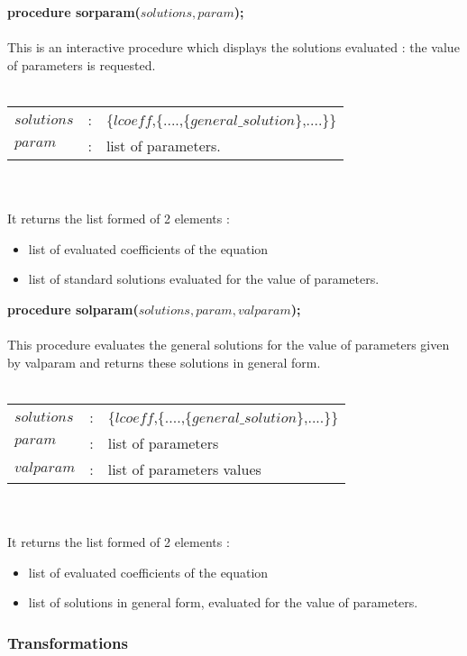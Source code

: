 {\bf procedure sorparam($solutions,param$);} \\
\ \\
This is an interactive procedure which displays the solutions evaluated :
the value of parameters is requested. \\
\ \\
\begin{tabular}{lcl}
$solutions$ & : & \{$lcoeff$,\{....,\{$general\_solution$\},....\}\} \\
$param$ & : & list of parameters. \\
\end{tabular} \\
\ \\
It returns the list formed of 2 elements :
\begin{itemize}
\item list of evaluated coefficients of the equation
\item list of standard solutions evaluated for the value of parameters.
\end{itemize}

{\bf procedure solparam($solutions,param,valparam$);} \\
\ \\
This procedure evaluates the general solutions for the value of parameters
given by valparam and returns these solutions in general form. \\
\ \\
\begin{tabular}{lcl}
$solutions$ & : & \{$lcoeff$,\{....,\{$general\_solution$\},....\}\} \\
$param$ & : & list of parameters \\
$valparam$ & : & list of parameters values \\
\end{tabular} \\
\ \\
It returns the list formed of 2 elements :
\begin{itemize}
\item list of evaluated coefficients of the equation 
\item list of solutions in general form, evaluated for the value of parameters.
\end{itemize}

\subsubsection{Transformations}


